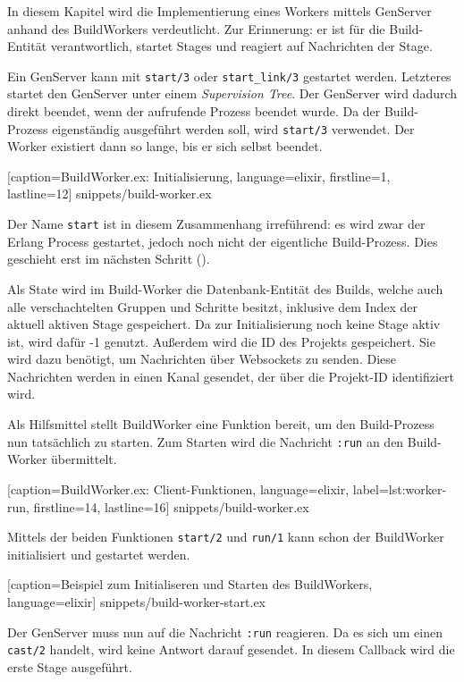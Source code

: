 In diesem Kapitel wird die Implementierung eines Workers mittels GenServer anhand des BuildWorkers verdeutlicht. Zur Erinnerung: er ist für die Build-Entität verantwortlich, startet Stages und reagiert auf Nachrichten der Stage.

Ein GenServer kann mit \texttt{start/3} oder \texttt{start\_link/3} gestartet werden. Letzteres startet den GenServer unter einem \emph{Supervision Tree}. Der GenServer wird dadurch direkt beendet, wenn der aufrufende Prozess beendet wurde. Da der Build-Prozess eigenständig ausgeführt werden soll, wird \texttt{start/3} verwendet. Der Worker existiert dann so lange, bis er sich selbst beendet.


  [caption={BuildWorker.ex: Initialisierung},
  language=elixir,
  firstline=1,
  lastline=12]
  {snippets/build-worker.ex}

Der Name \texttt{start} ist in diesem Zusammenhang irreführend: es wird zwar der Erlang Process gestartet, jedoch noch nicht der eigentliche Build-Prozess. Dies geschieht erst im nächsten Schritt ().

Als State wird im Build-Worker die Datenbank-Entität des Builds, welche auch alle verschachtelten Gruppen und Schritte besitzt, inklusive dem Index der aktuell aktiven Stage gespeichert. Da zur Initialisierung noch keine Stage aktiv ist, wird dafür -1 genutzt. Außerdem wird die ID des Projekts gespeichert. Sie wird dazu benötigt, um Nachrichten über Websockets zu senden. Diese Nachrichten werden in einen Kanal gesendet, der über die Projekt-ID identifiziert wird.

Als Hilfsmittel stellt BuildWorker eine Funktion bereit, um den Build-Prozess nun tatsächlich zu starten. Zum Starten wird die Nachricht \texttt{:run} an den Build-Worker übermittelt.


  [caption={BuildWorker.ex: Client-Funktionen},
  language=elixir,
  label={lst:worker-run},
  firstline=14,
  lastline=16]
  {snippets/build-worker.ex}

Mittels der beiden Funktionen \texttt{start/2} und \texttt{run/1} kann schon der BuildWorker initialisiert und gestartet werden.


  [caption={Beispiel zum Initialiseren und Starten des BuildWorkers},
  language=elixir]
  {snippets/build-worker-start.ex}

Der GenServer muss nun auf die Nachricht \texttt{:run} reagieren. Da es sich um einen \texttt{cast/2} handelt, wird keine Antwort darauf gesendet. In diesem Callback wird die erste Stage ausgeführt.

